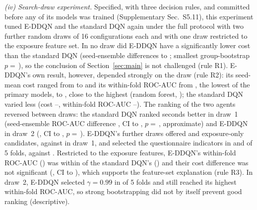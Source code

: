 \emph{(iv) Search-draw experiment.} Specified, with three decision rules, and committed before any of its models was trained (Supplementary Sec.~S5.11), this experiment tuned E-DDQN and the standard DQN again under the full protocol with two further random draws of 16 configurations each and with one draw restricted to the exposure feature set. In no draw did E-DDQN have a significantly lower cost than the standard DQN (seed-ensemble differences \SDCostDiffMin{} to \SDCostDiffMax; smallest group-bootstrap $p=$\,\SDCostPMin), so the conclusion of Section~\ref{sec:main} is not challenged (rule R1). E-DDQN's own result, however, depended strongly on the draw (rule R2): its seed-mean cost ranged from \SDEDDQNCostMin{} to \SDEDDQNCostMax{} and its within-fold ROC-AUC from \SDEDDQNWfMin, the lowest of the primary models, to \SDEDDQNWfMax, close to the highest (random forest, \PHWfRFAuc); the standard DQN varied less (cost \SDDQNCostMin--\SDDQNCostMax, within-fold ROC-AUC \SDDQNWfMin--\SDDQNWfMax). The ranking of the two agents reversed between draws: the standard DQN ranked seconds better in draw~1 (seed-ensemble ROC-AUC difference \SDPairOneAucDiff, CI \SDPairOneAucLow{} to \SDPairOneAucHigh, $p=$\,\SDPairOneAucP, approximate) and E-DDQN in draw~2 (\SDPairTwoAucDiff, CI \SDPairTwoAucLow{} to \SDPairTwoAucHigh, $p=$\,\SDPairTwoAucP). E-DDQN's further draws offered \SDEDDQNDrawTwoExpCand{} and \SDEDDQNDrawThreeExpCand{} exposure-only candidates, against \SDEDDQNDrawOneExpCand{} in draw~1, and selected the questionnaire indicators in \SDEDDQNDrawTwoQFolds{} and \SDEDDQNDrawThreeQFolds{} of 5 folds, against \SDEDDQNDrawOneQFolds. Restricted to the exposure features, E-DDQN's within-fold ROC-AUC (\SDEDDQNExposureWfAuc) was within \SDExposureGap{} of the standard DQN's (\SDDQNExposureWfAuc) and their cost difference was not significant (\SDPairExposureDiff, CI \SDPairExposureLow{} to \SDPairExposureHigh), which supports the feature-set explanation (rule R3). In draw~2, E-DDQN selected $\gamma=0.99$ in \SDEDDQNDrawTwoStrongGammaFolds{} of 5 folds and still reached its highest within-fold ROC-AUC, so strong bootstrapping did not by itself prevent good ranking (descriptive).

